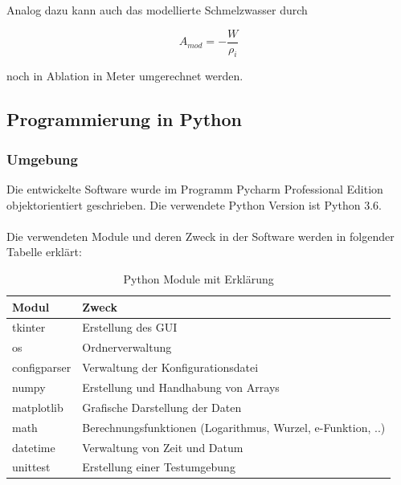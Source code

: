 \documentclass[12pt,a4paper]{article}
\begin{document}
Analog dazu kann auch das modellierte Schmelzwasser durch

\begin{equation}
A_{mod} = -\frac{W}{\rho_{i}}
\end{equation}

noch in Ablation in Meter umgerechnet werden.


\subsection{Programmierung in Python}
\subsubsection{Umgebung}

Die entwickelte Software wurde im Programm Pycharm Professional Edition objektorientiert geschrieben. Die verwendete Python Version ist Python 3.6.\\\\
Die verwendeten Module und deren Zweck in der Software werden in folgender Tabelle erklärt:


\begin{table}[H]
\centering
{} 
\caption{Python Module mit Erklärung}
\label{tab:Python Module}
\begin{tabular}{|l|l|}
\hline
\textbf{Modul} & \textbf{Zweck}                                \\ \hline
tkinter             & Erstellung des GUI         \\
os             & Ordnerverwaltung         \\
configparser             & Verwaltung der Konfigurationsdatei         \\
numpy          & Erstellung und Handhabung von Arrays          \\
matplotlib     & Grafische Darstellung der Daten               \\
math		   & Berechnungsfunktionen (Logarithmus, Wurzel, e-Funktion, ..)   \\  
datetime		   & Verwaltung von Zeit und Datum   \\
unittest		   & Erstellung einer Testumgebung   \\  \hline


\end{tabular}
\end{table}
\vspace{0.3cm}
\end{document}
